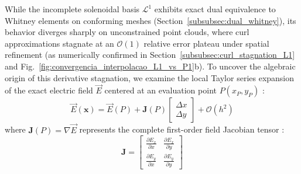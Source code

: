 \documentclass[preprint,12pt]{elsarticle}
\begin{document}
While the incomplete solenoidal basis $\mathcal{L}^1$ exhibits exact dual equivalence to Whitney elements on conforming meshes (Section~\ref{subsubsec:dual_whitney}), its behavior diverges sharply on unconstrained point clouds, where curl approximations stagnate at an $\mathcal{O}(1)$ relative error plateau under spatial refinement (as numerically confirmed in Section~\ref{subsubsec:curl_stagnation_L1} and Fig.~\ref{fig:convergencia_interpolacao_L1_vs_P1}b). To uncover the algebraic origin of this derivative stagnation, we examine the local Taylor series expansion of the exact electric field $\vec{E}$ centered at an evaluation point $P(x_P, y_P)$ \cite{li2007meshfree, liu2009mesh}:
\begin{equation}
    \vec{E}(\mathbf{x}) = \vec{E}(P) + \mathbf{J}(P) \begin{bmatrix} \Delta x \\[2pt] \Delta y \end{bmatrix} + \mathcal{O}(h^2)
    \label{eq:taylor_vector_expansion}
\end{equation}
where $\mathbf{J}(P) = \nabla \vec{E}$ represents the complete first-order field Jacobian tensor \cite{liu2009mesh}:
\begin{equation}
    \mathbf{J} = \begin{bmatrix}
        \frac{\partial E_x}{\partial x} & \frac{\partial E_x}{\partial y} \\[4pt]
        \frac{\partial E_y}{\partial x} & \frac{\partial E_y}{\partial y}
    \end{bmatrix}
    \label{eq:jacobian_tensor_raw}
\end{equation}
\end{document}
